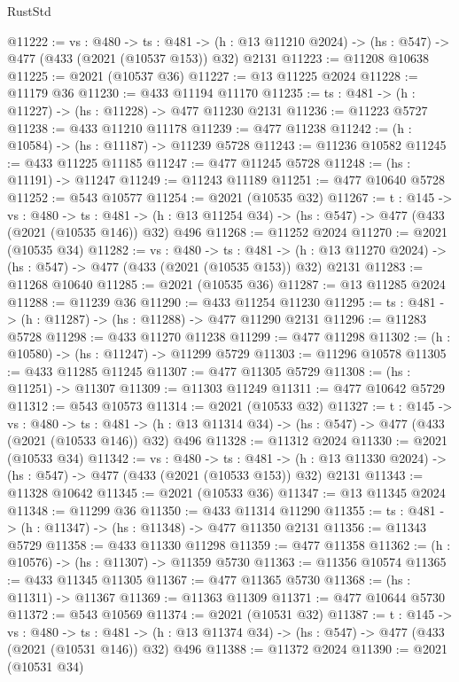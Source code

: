 \begin{lexlean}{RustStd}
\begin{coremodule}
@11222 := {vs : @480} ->
  {ts : @481} ->
  (h : @13 @11210 @2024) -> (hs : @547) -> @477 (@433 (@2021 (@10537 @153)) @32) @2131
@11223 := @11208 @10638
@11225 := @2021 (@10537 @36)
@11227 := @13 @11225 @2024
@11228 := @11179 @36
@11230 := @433 @11194 @11170
@11235 := {ts : @481} -> (h : @11227) -> (hs : @11228) -> @477 @11230 @2131
@11236 := @11223 @5727
@11238 := @433 @11210 @11178
@11239 := @477 @11238
@11242 := (h : @10584) -> (hs : @11187) -> @11239 @5728
@11243 := @11236 @10582
@11245 := @433 @11225 @11185
@11247 := @477 @11245 @5728
@11248 := (hs : @11191) -> @11247
@11249 := @11243 @11189
@11251 := @477 @10640 @5728
@11252 := @543 @10577
@11254 := @2021 (@10535 @32)
@11267 := {t : @145} ->
  {vs : @480} ->
  {ts : @481} -> (h : @13 @11254 @34) -> (hs : @547) -> @477 (@433 (@2021 (@10535 @146)) @32) @496
@11268 := @11252 @2024
@11270 := @2021 (@10535 @34)
@11282 := {vs : @480} ->
  {ts : @481} ->
  (h : @13 @11270 @2024) -> (hs : @547) -> @477 (@433 (@2021 (@10535 @153)) @32) @2131
@11283 := @11268 @10640
@11285 := @2021 (@10535 @36)
@11287 := @13 @11285 @2024
@11288 := @11239 @36
@11290 := @433 @11254 @11230
@11295 := {ts : @481} -> (h : @11287) -> (hs : @11288) -> @477 @11290 @2131
@11296 := @11283 @5728
@11298 := @433 @11270 @11238
@11299 := @477 @11298
@11302 := (h : @10580) -> (hs : @11247) -> @11299 @5729
@11303 := @11296 @10578
@11305 := @433 @11285 @11245
@11307 := @477 @11305 @5729
@11308 := (hs : @11251) -> @11307
@11309 := @11303 @11249
@11311 := @477 @10642 @5729
@11312 := @543 @10573
@11314 := @2021 (@10533 @32)
@11327 := {t : @145} ->
  {vs : @480} ->
  {ts : @481} -> (h : @13 @11314 @34) -> (hs : @547) -> @477 (@433 (@2021 (@10533 @146)) @32) @496
@11328 := @11312 @2024
@11330 := @2021 (@10533 @34)
@11342 := {vs : @480} ->
  {ts : @481} ->
  (h : @13 @11330 @2024) -> (hs : @547) -> @477 (@433 (@2021 (@10533 @153)) @32) @2131
@11343 := @11328 @10642
@11345 := @2021 (@10533 @36)
@11347 := @13 @11345 @2024
@11348 := @11299 @36
@11350 := @433 @11314 @11290
@11355 := {ts : @481} -> (h : @11347) -> (hs : @11348) -> @477 @11350 @2131
@11356 := @11343 @5729
@11358 := @433 @11330 @11298
@11359 := @477 @11358
@11362 := (h : @10576) -> (hs : @11307) -> @11359 @5730
@11363 := @11356 @10574
@11365 := @433 @11345 @11305
@11367 := @477 @11365 @5730
@11368 := (hs : @11311) -> @11367
@11369 := @11363 @11309
@11371 := @477 @10644 @5730
@11372 := @543 @10569
@11374 := @2021 (@10531 @32)
@11387 := {t : @145} ->
  {vs : @480} ->
  {ts : @481} -> (h : @13 @11374 @34) -> (hs : @547) -> @477 (@433 (@2021 (@10531 @146)) @32) @496
@11388 := @11372 @2024
@11390 := @2021 (@10531 @34)

\end{coremodule}
\end{lexlean}
